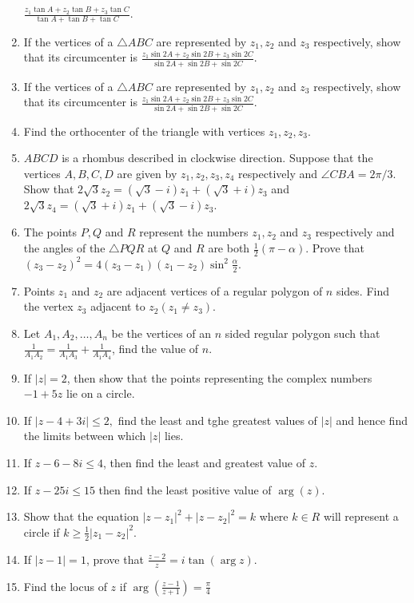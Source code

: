 \begin{enumerate}[resume]
  $\frac{z_1\tan A + z_2\tan B + z_3\tan C}{\tan A + \tan B + \tan C}$.
\item If the vertices of a $\triangle ABC$ are represented by $z_1, z_2$ and $z_3$ respectively, show that its
  circumcenter is $\frac{z_1\sin 2A + z_2\sin 2B + z_3\sin 2C}{\sin 2A + \sin 2B + \sin 2C}$.
\item If the vertices of a $\triangle ABC$ are represented by $z_1, z_2$ and $z_3$ respectively, show that its
  circumcenter is $\frac{z_1\sin 2A + z_2\sin 2B + z_3\sin 2C}{\sin 2A + \sin 2B + \sin 2C}$.
\item Find the orthocenter of the triangle with vertices $z_1, z_2, z_3$.
\item $ABCD$ is a rhombus described in clockwise direction. Suppose that the vertices $A, B, C, D$ are given by $z_1,
  z_2, z_3, z_4$ respectively and $\angle CBA = 2\pi/3$. Show that $2\sqrt{3}z_2 = (\sqrt{3} - i)z_1 + (\sqrt{3} + i)z_3$ and
  $2\sqrt{3}z_4 = (\sqrt{3} + i)z_1 + (\sqrt{3} - i)z_3$.
\item The points $P, Q$ and $R$ represent the numbers $z_1, z_2$ and $z_3$ respectively and the angles of the $\triangle
  PQR$ at $Q$ and $R$ are both $\frac{1}{2}(\pi - \alpha)$. Prove that $(z_3 - z_2)^2 = 4(z_3 - z_1)(z_1 -
  z_2)\sin^2\frac{\alpha}{2}$.
\item Points $z_1$ and $z_2$ are adjacent vertices of a regular polygon of $n$ sides. Find the vertex $z_3$ adjacent to
  $z_2(z_1\neq z_3)$.
\item Let $A_1, A_2, \ldots, A_n$ be the vertices of an $n$ sided regular polygon such that $\frac{1}{A_1A_2} =
  \frac{1}{A_1A_3} + \frac{1}{A_1A_4}$, find the value of $n$.
\item If $|z| = 2$, then show that the points representing the complex numbers $-1 + 5z$ lie on a circle.
\item If $|z - 4 + 3i|\leq 2,$ find the least and tghe greatest values of $|z|$ and hence find the limits between which
  $|z|$ lies.
\item If $z - 6 - 8i\leq 4$, then find the least and greatest value of $z$.
\item If $z - 25i\leq 15$ then find the least positive value of $\arg(z)$.
\item Show that the equation $|z - z_1|^2 + |z - z_2|^2 = k$ where $k\in R$ will represent a circle if $k\geq \frac{1}{2}|z_1 -
  z_2|^2$.
\item If $|z - 1| = 1$, prove that $\frac{z - 2}{z} = i\tan(\arg z)$.
\item Find the locus of $z$ if $\arg\left(\frac{z - 1}{z + 1}\right) = \frac{\pi}{4}$

\end{enumerate}
